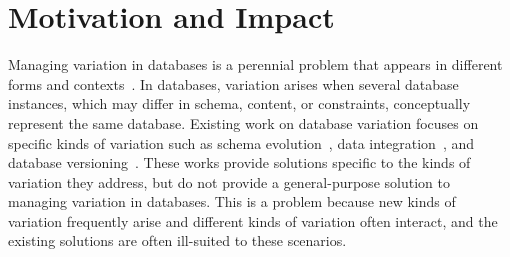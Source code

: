 \section{Motivation and Impact}
\label{sec:mot}


Managing variation in databases is a perennial problem that appears in
different forms and
contexts~\cite{curateVdata,ALW21vamos,ready17cidr,clams16sigmod,datahub15cidr}.
%
In databases, variation arises when several database instances, which may
differ in schema, content, or constraints, conceptually represent the same
database.
%
%
Existing work on database variation focuses on specific kinds of variation such
as schema evolution~\cite{SchEvolRA90McKenzie, schVersioning97Castro,
tempSchEvol91Ariav, tsql95Snodgrass, prima08Moon}, data
integration~\cite{dataIntegBook}, and database
versioning~\cite{datasetVersioning,dbVersioning}. These works provide solutions
specific to the kinds of variation they address, but do not provide a
general-purpose solution to managing variation in databases.
%
This is a problem because new kinds of variation frequently arise and different
kinds of variation often interact, and the existing solutions are often
ill-suited to these scenarios.




